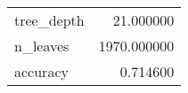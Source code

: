 \begin{tabular}{lr}
\toprule
 &  \\
\midrule
tree\_depth & 21.000000 \\
n\_leaves & 1970.000000 \\
accuracy & 0.714600 \\
\bottomrule
\end{tabular}